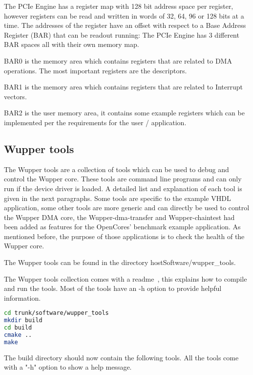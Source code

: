 The PCIe Engine has a register map with 128 bit address space per register, however registers can be read and written in words of 32, 64, 96 or 128 bits at a time. The addresses of the register have an offset with respect to a Base Address Register (BAR) that can be readout running: The PCIe Engine has 3 different BAR spaces all with their own memory map. 

BAR0 is the memory area which contains registers that are related to DMA operations. The most important registers are the descriptors.

BAR1 is the memory area which contains registers that are related to Interrupt vectors.

BAR2 is the user memory area, it contains some example registers which can be implemented per the requirements for the user / application.

\subsection{Wupper tools}
The Wupper tools are a collection of tools which can be used to debug and control the Wupper core. These tools are command line programs and can only run if the device driver is loaded. A detailed list and explanation of each tool is given in the next paragraphs. Some tools are specific to the example VHDL application, some other tools are more generic and can directly be used to control the Wupper DMA core, the Wupper-dma-transfer and Wupper-chaintest had been added as features for the OpenCores' benchmark example application. As mentioned before, the purpose of those applications is to check the health of the Wupper core. 

The Wupper tools can be found in the directory hostSoftware/wupper\_tools.

The Wupper tools collection comes with a readme~\cite{wupperreadme}, this explains how to compile and run the tools. Most of the tools have an -h option to provide helpful information. 

\begin{lstlisting}[language=BASH, frame=single, caption=Building Wupper Tools]
cd trunk/software/wupper_tools
mkdir build
cd build
cmake ..
make
\end{lstlisting}
The build directory should now contain the following tools. All the tools come with a "-h" option to show a help message.

